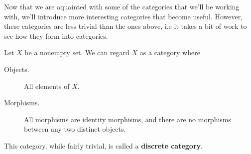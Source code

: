     Now that we are aquainted with some of the categories that we'll be working with, 
    we'll introduce more interesting categories that become useful. However, 
    these categories are less trivial than the ones above, i.e it takes a bit of work 
    to see how they form into categories. 


    \begin{example}
        Let $X$ be a nonempty set. We can regard $X$ as a 
        category where 
        \begin{description}
            \item[Objects.] All elements of $X$.
            \item[Morphisms.] All morphisms are identity morphisms, and there are 
            no morphisms between any two distinct objects.  
        \end{description}
        This category, while fairly trivial, is called a \textbf{discrete category}.
    \end{example}


